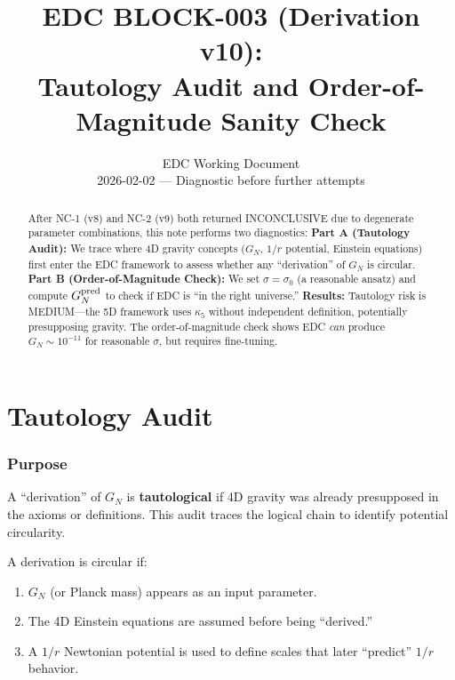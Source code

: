 \documentclass[11pt,a4paper]{article}
\title{\textbf{EDC BLOCK-003 (Derivation v10):}\\[0.3em]
Tautology Audit and Order-of-Magnitude Sanity Check}
\author{EDC Working Document\\[0.5em]
\small 2026-02-02 --- Diagnostic before further attempts}
\date{}
\begin{document}
\maketitle

\begin{abstract}
After NC-1 (v8) and NC-2 (v9) both returned INCONCLUSIVE due to degenerate
parameter combinations, this note performs two diagnostics:
\textbf{Part A (Tautology Audit):} We trace where 4D gravity concepts
($G_N$, $1/r$ potential, Einstein equations) first enter the EDC framework
to assess whether any ``derivation'' of $G_N$ is circular.
\textbf{Part B (Order-of-Magnitude Check):} We set $\sigma = \sigma_0$
(a reasonable ansatz) and compute $G_N^{\rm pred}$ to check if EDC is
``in the right universe.''
\textbf{Results:} Tautology risk is MEDIUM---the 5D framework uses $\kappa_5$
without independent definition, potentially presupposing gravity. The
order-of-magnitude check shows EDC \textit{can} produce $G_N \sim 10^{-11}$
for reasonable $\sigma$, but requires fine-tuning.
\end{abstract}

\tableofcontents
\newpage

\part{Tautology Audit}

\section{Purpose}

A ``derivation'' of $G_N$ is \textbf{tautological} if 4D gravity was
already presupposed in the axioms or definitions. This audit traces the
logical chain to identify potential circularity.

\begin{auditbox}
A derivation is circular if:
\begin{enumerate}
\item $G_N$ (or Planck mass) appears as an input parameter.
\item The 4D Einstein equations are assumed before being ``derived.''
\item A $1/r$ Newtonian potential is used to define scales that later
``predict'' $1/r$ behavior.
\end{enumerate}
\end{auditbox}
\end{document}
